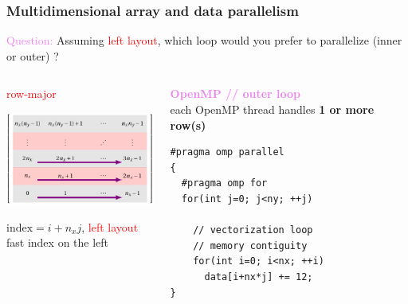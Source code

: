\begin{frame}[fragile=singleslide]
  \frametitle{Multidimensional array and data parallelism}

  \begin{block}{}
    {\large \textcolor{violet}{Question:}
    Assuming \textcolor{red}{left layout}, which loop would you prefer to parallelize (inner or outer) ?}    
  \end{block}
  
  \begin{columns}
    \begin{column}{0.48\textwidth}
      \begin{center}
        \textcolor{red}{\large row-major}
        
        \includegraphics[width=5cm]{images/tikz/row-major-openmp}

        $\text{index} = i + n_x j$, \textcolor{red}{left layout}\\
        fast index on the left
      \end{center}
    \end{column}
    \begin{column}{0.48\textwidth}
      \begin{center}
        \textcolor{violet}{\bf OpenMP // outer loop}\\
        each OpenMP thread handles {\bf 1 or more row(s)}
      \end{center}
      \begin{verbatim}
#pragma omp parallel
{
  #pragma omp for
  for(int j=0; j<ny; ++j)

    // vectorization loop
    // memory contiguity
    for(int i=0; i<nx; ++i)
      data[i+nx*j] += 12;
}
      \end{verbatim}
    \end{column}
    \hfill
  \end{columns}
\end{frame}

